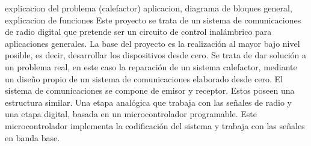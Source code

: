 explicacion del problema (calefactor) aplicacion, diagrama de bloques general, explicacion de funciones
Este proyecto se trata de un sistema de comunicaciones de radio digital que pretende ser un circuito de control inalámbrico para aplicaciones generales. 
La base del proyecto es la realización al mayor bajo nivel posible, es decir, desarrollar los dispositivos desde cero.
Se trata de dar solución a un problema real, en este caso la reparación de un sistema calefactor, mediante un diseño propio de un sistema de comunicaciones elaborado desde cero.
El sistema de comunicaciones se compone de emisor y receptor. Estos poseen una estructura similar. Una etapa analógica que trabaja con las señales de radio y una etapa digital, basada en un microcontrolador programable. Este microcontrolador implementa la codificación del sistema y trabaja con las señales en banda base.
